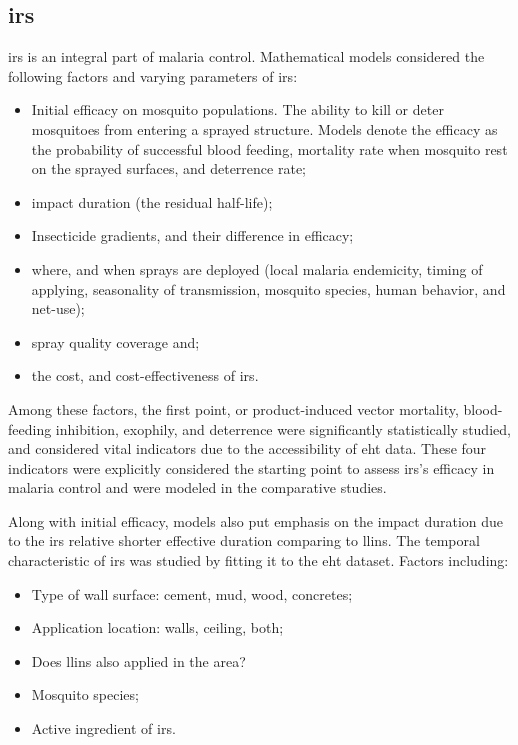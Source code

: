 \documentclass[a4paper, 12pt, twoside]{report}
\begin{document}
\subsection{\texorpdfstring{\gls{irs}}{IRS}}
\gls{irs} is an integral part of malaria control.
Mathematical models considered the following factors and varying parameters of \gls{irs}\cite{Sherrard-Smith2018b}:

\begin{itemize}
	\item Initial efficacy on mosquito populations. The ability to kill or deter mosquitoes from entering a sprayed structure. Models denote the efficacy as the probability of successful blood feeding, mortality rate when mosquito rest on the sprayed surfaces, and deterrence rate;
	\item impact duration (the residual half-life);
  \item Insecticide gradients, and their difference in efficacy;
	\item where, and when sprays are deployed (local malaria endemicity, timing of applying, seasonality of transmission, mosquito species, human behavior, and net-use);
	\item spray quality coverage and; 
  \item the cost, and cost-effectiveness of \gls{irs}.
\end{itemize}

Among these factors, the first point, or product-induced vector mortality, blood-feeding inhibition, exophily, and deterrence were significantly statistically studied, and considered vital indicators due to the accessibility of \gls{eht} data.
These four indicators were explicitly considered the starting point to assess \gls{irs}'s efficacy in malaria control and were modeled in the comparative studies.

Along with initial efficacy, models also put emphasis on the impact duration due to the \gls{irs} relative shorter effective duration comparing to \gls{llins}.
The temporal characteristic of \gls{irs} was studied by fitting it to the \gls{eht} dataset.
Factors including:
\begin{itemize}
  \item Type of wall surface: cement, mud, wood, concretes;
  \item Application location: walls, ceiling, both;
  \item Does \gls{llins} also applied in the area?
  \item Mosquito species;
  \item Active ingredient of \gls{irs}.
\end{itemize}
\end{document}
